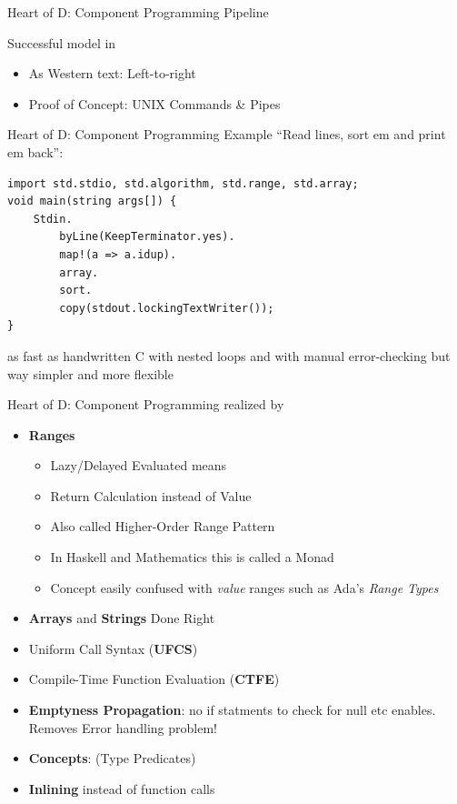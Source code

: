 \documentclass[xcolor=dvipsnames]{beamer}
\begin{document}
\begin{frame}[fragile]{Heart of D: Component Programming Pipeline}
  \begin{figure}
  \end{figure}
  Successful model in
  \begin{itemize}[<+->]
  \item As Western text: Left-to-right
  \item Proof of Concept: UNIX Commands \& Pipes
  \end{itemize}
\end{frame}

\begin{frame}[fragile]{Heart of D: Component Programming Example}
  ``Read lines, sort em and print em back'':
\begin{lstlisting}[frame=single]
import std.stdio, std.algorithm, std.range, std.array;
void main(string args[]) {
    Stdin.
        byLine(KeepTerminator.yes).
        map!(a => a.idup).
        array.
        sort.
        copy(stdout.lockingTextWriter());
}
\end{lstlisting}
as fast as handwritten C with nested loops and with manual error-checking but
way simpler and more flexible
\end{frame}

\begin{frame}[fragile]{Heart of D: Component Programming realized by}
  \begin{itemize}[<+->]
  \item \textbf{Ranges}
    \begin{itemize}[<+->]
    \item Lazy/Delayed Evaluated means
    \item Return Calculation instead of Value
    \item Also called Higher-Order Range Pattern
    \item In Haskell and Mathematics this is called a Monad
    \item Concept easily confused with \emph{value} ranges such as Ada's
      \emph{Range Types}
    \end{itemize}
  \item \textbf{Arrays} and \textbf{Strings} Done Right
  \item Uniform Call Syntax (\textbf{UFCS})
  \item Compile-Time Function Evaluation (\textbf{CTFE})
  \item \textbf{Emptyness Propagation}: no if statments to check for null etc
    enables. Removes Error handling problem!
  \item \textbf{Concepts}: (Type Predicates)
  \item \textbf{Inlining} instead of function calls
  \end{itemize}
\end{frame}
\end{document}
